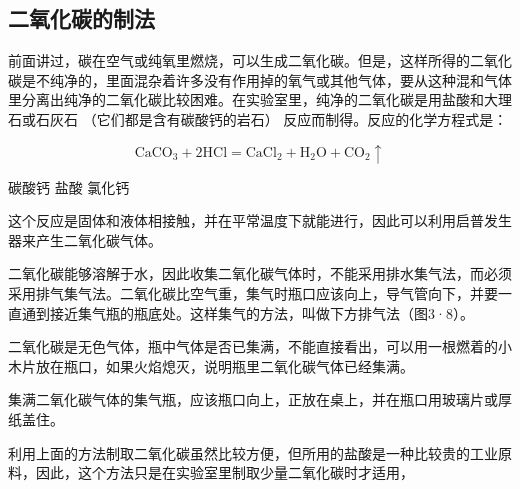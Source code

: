 \subsection{二氧化碳的制法}

前面讲过，碳在空气或纯氧里燃烧，可以生成二氧化碳。但是，这样所得的二氧化碳是不纯净的，里面混杂着许多没有作用掉的氧气或其他气体，要从这种混和气体里分离出纯净的二氧化碳比较困难。在实验室里，纯净的二氧化碳是用盐酸和大理石或石灰石
（它们都是含有碳酸钙的岩石） 反应而制得。反应的化学方程式是：

\[
\mathrm{CaCO}_{3} + 2 \mathrm{HCl} = \mathrm{CaCl}_{2} + \mathrm{H}_{2} \mathrm{O} + \mathrm{CO}_{2} \uparrow
\]

碳酸钙 盐酸 氯化钙

这个反应是固体和液体相接触，并在平常温度下就能进行，因此可以利用启普发生器来产生二氧化碳气体。

二氧化碳能够溶解于水，因此收集二氧化碳气体时，不能采用排水集气法，而必须采用排气集气法。二氧化碳比空气重，集气时瓶口应该向上，导气管向下，并要一直通到接近集气瓶的瓶底处。这样集气的方法，叫做下方排气法（图3·8）。

二氧化碳是无色气体，瓶中气体是否已集满，不能直接看出，可以用一根燃着的小木片放在瓶口，如果火焰熄灭，说明瓶里二氧化碳气体已经集满。

集满二氧化碳气体的集气瓶，应该瓶口向上，正放在桌上，并在瓶口用玻璃片或厚纸盖住。

利用上面的方法制取二氧化碳虽然比较方便，但所用的盐酸是一种比较贵的工业原料，因此，这个方法只是在实验室里制取少量二氧化碳时才适用，


